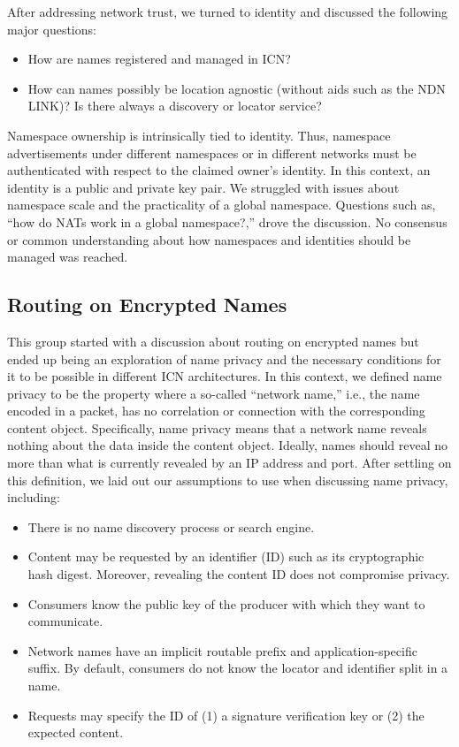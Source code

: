 \documentclass{sig-alternate-10pt}
\begin{document}
After addressing network trust, we turned to identity and discussed the following major questions:
%
\begin{itemize}
\item How are names registered and managed in ICN?
\item How can names possibly be location agnostic (without aids such as the NDN LINK)? Is there always a discovery or locator service?
\end{itemize}
%
Namespace ownership is intrinsically tied to identity. Thus, namespace advertisements under different namespaces or in different networks must be authenticated with respect to the claimed owner's identity. In this context, an identity is a public and private key pair. We struggled with issues about namespace scale and the practicality of a global namespace. Questions such as, ``how do NATs work in a global namespace?,'' drove the discussion. No consensus or common understanding about how namespaces and identities should be managed was reached.


\subsection{Routing on Encrypted Names}
This group started with a discussion about routing on encrypted names but ended up being an exploration of name privacy and the necessary conditions for it to be possible in different ICN architectures. In this context, we defined name privacy to be the property where a so-called ``network name,'' i.e., the name encoded in a packet, has no correlation or connection with the corresponding content object. Specifically, name privacy means that a network name reveals nothing about the data inside the content object. Ideally, names should reveal no more than what is currently revealed by an IP address and port. After settling on this definition, we laid out our assumptions to use when discussing name privacy, including:

\begin{itemize}
\item There is no name discovery process or search engine.
\item Content may be requested by an identifier (ID) such as its cryptographic hash digest. Moreover, revealing the content ID does not compromise privacy.
\item Consumers know the public key of the producer with which they want to communicate.
\item Network names have an implicit routable prefix and application-specific suffix. By default, consumers do not know the locator and identifier split in a name.
\item Requests may specify the ID of (1) a signature verification key or (2) the expected content.
\end{itemize}
\end{document}
